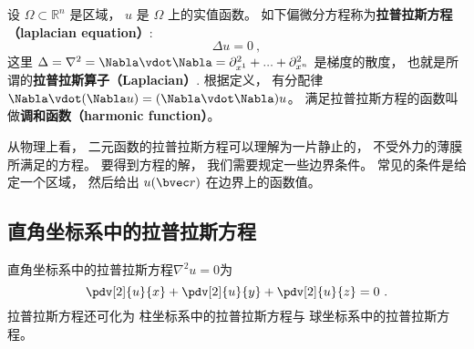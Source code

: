 

设 $\Omega\subset\mathbb{R}^n$ 是区域， $u$ 是 $\Omega$ 上的实值函数。 如下偏微分方程称为\textbf{拉普拉斯方程（laplacian equation）}:
\begin{equation}\label{eq_LapEq_6}
\Delta u = 0~,
\end{equation}
这里 $\Delta=\nabla^2 = \Nabla\vdot\Nabla=\partial_{x^1}^2+...+\partial_{x^n}^2$ 是梯度的散度， 也就是所谓的\textbf{拉普拉斯算子（Laplacian）}. 根据定义， 有分配律 $\Nabla \vdot (\Nabla u) = (\Nabla \vdot \Nabla) u$。 满足拉普拉斯方程的函数叫做\textbf{调和函数（harmonic function）}。

从物理上看， 二元函数的拉普拉斯方程可以理解为一片静止的， 不受外力的薄膜所满足的方程。 要得到方程的解， 我们需要规定一些边界条件。 常见的条件是给定一个区域， 然后给出 $u(\bvec r)$ 在边界上的函数值。

\subsection{直角坐标系中的拉普拉斯方程}
直角坐标系中的拉普拉斯方程$\nabla^2u=0$为
\begin{equation}
\pdv[2]{u}{x}+\pdv[2]{u}{y}+\pdv[2]{u}{z}=0~.
\end{equation}
拉普拉斯方程还可化为 柱坐标系中的拉普拉斯方程与 球坐标系中的拉普拉斯方程。

